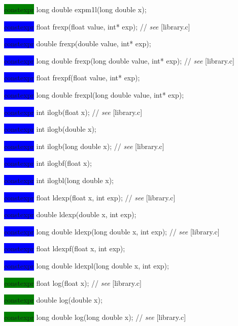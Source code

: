 \documentclass[prd,twocolumn,amsmath,amssymb,nofootinbib,eqsecnum]{revtex4-1}
\newcommand{\highlight}[1]{\colorbox{green}{\!\!\!\! #1}}
\newcommand{\oldhighlight}[1]{\colorbox{blue}{\!\!\!\! #1}}
\newcommand{\stdcomment}[1]{{// {\it see} [#1]}}
\begin{document}
{\highlight{constexpr} long double expm1l(long double x);

\vspace{2ex}


\oldhighlight{constexpr}  float frexp(float value, int* exp); \stdcomment{library.c}

\oldhighlight{constexpr}  double frexp(double value, int* exp);

\oldhighlight{constexpr}  long double frexp(long double value, int* exp); \stdcomment{library.c}

\oldhighlight{constexpr}  float frexpf(float value, int* exp);

\oldhighlight{constexpr}  long double frexpl(long double value, int* exp);

\vspace{2ex}


\oldhighlight{constexpr} int ilogb(float x); \stdcomment{library.c}

\oldhighlight{constexpr} int ilogb(double x);

\oldhighlight{constexpr} int ilogb(long double x); \stdcomment{library.c}

\oldhighlight{constexpr} int ilogbf(float x);

\oldhighlight{constexpr} int ilogbl(long double x);

\vspace{2ex}


\oldhighlight{constexpr} float ldexp(float x, int exp); \stdcomment{library.c}

\oldhighlight{constexpr} double ldexp(double x, int exp);

\oldhighlight{constexpr} long double ldexp(long double x, int exp); \stdcomment{library.c}

\oldhighlight{constexpr} float ldexpf(float x, int exp);

\oldhighlight{constexpr} long double ldexpl(long double x, int exp);

\vspace{2ex}


\highlight{constexpr} float log(float x); \stdcomment{library.c}

\highlight{constexpr} double log(double x);

\highlight{constexpr} long double log(long double x); \stdcomment{library.c}

}
\end{document}
